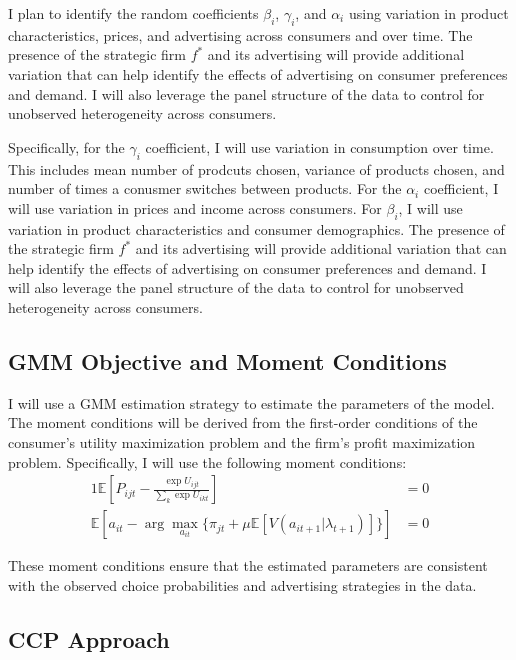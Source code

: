 \documentclass[12pt]{article}
\begin{document}
    I plan to identify the random coefficients $\beta_i$, $\gamma_i$, and $\alpha_i$ using variation in product characteristics, prices, and advertising across consumers and over time. The presence of the strategic firm $f^*$ and its advertising will provide additional variation that can help identify the effects of advertising on consumer preferences and demand. I will also leverage the panel structure of the data to control for unobserved heterogeneity across consumers.

    Specifically, for the $\gamma_i$ coefficient, I will use variation in consumption over time. This includes mean number of prodcuts chosen, variance of products chosen, and number of times a conusmer switches between products. For the $\alpha_i$ coefficient, I will use variation in prices and income across consumers. For $\beta_i$, I will use variation in product characteristics and consumer demographics. The presence of the strategic firm $f^*$ and its advertising will provide additional variation that can help identify the effects of advertising on consumer preferences and demand. I will also leverage the panel structure of the data to control for unobserved heterogeneity across consumers.

    \subsection{GMM Objective and Moment Conditions}

      I will use a GMM estimation strategy to estimate the parameters of the model. The moment conditions will be derived from the first-order conditions of the consumer's utility maximization problem and the firm's profit maximization problem. Specifically, I will use the following moment conditions:
      \begin{alignat*}{1}
        \mathbb{E}[P_{ijt} - \frac{\exp{U_{ijt}}}{\sum_k\exp{U_{ikt}}}] &= 0 \\
        \mathbb{E}[a_{it} - \arg\max_{a_{it}} \{\pi_{jt} + \mu \mathbb{E}[V(a_{it+1} | \lambda_{t+1})]\}] &= 0
      \end{alignat*}

        These moment conditions ensure that the estimated parameters are consistent with the observed choice probabilities and advertising strategies in the data.

    \subsection{CCP Approach}
\end{document}
